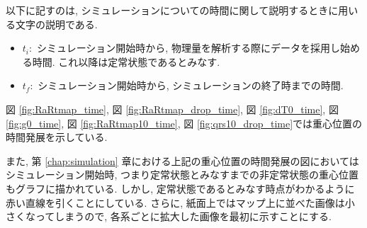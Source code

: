 以下に記すのは, シミュレーションについての時間に関して説明するときに用いる文字の説明である.

\begin{itemize}
  \item $t_i \colon$ シミュレーション開始時から, 物理量を解析する際にデータを採用し始める時間. これ以降は定常状態であるとみなす.
  \item $t_f \colon$ シミュレーション開始時から, シミュレーションの終了時までの時間.
\end{itemize}

図 \ref{fig:RaRtmap_time}, 図 \ref{fig:RaRtmap_drop_time}, 図 \ref{fig:dT0_time}, 図 \ref{fig:g0_time}, 図 \ref{fig:RaRtmap10_time}, 図 \ref{fig:qrs10_drop_time}では重心位置の時間発展を示している.

また, 第 \ref{chap:simulation} 章における上記の重心位置の時間発展の図においてはシミュレーション開始時, つまり定常状態とみなすまでの非定常状態の重心位置もグラフに描かれている. しかし, 定常状態であるとみなす時点がわかるように赤い直線を引くことにしている. さらに, 紙面上ではマップ上に並べた画像は小さくなってしまうので, 各系ごとに拡大した画像を最初に示すことにする. 
